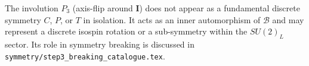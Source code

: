 \documentclass[12pt,a4paper]{article}
\theoremstyle{definition}
\theoremstyle{remark}
\begin{document}
\begin{insightbox}
The involution $P_3$ (axis-flip around $\mathbf{I}$) does not appear as a
fundamental discrete symmetry $C$, $P$, or $T$ in isolation.
It acts as an inner automorphism of $\mathcal{B}$ and may represent a discrete
isospin rotation or a sub-symmetry within the $SU(2)_L$ sector.
Its role in symmetry breaking is discussed in
\texttt{symmetry/step3\_breaking\_catalogue.tex}.
\end{insightbox}

\ifdefined\INCLUDEMODE
\else
  
\end{document}
